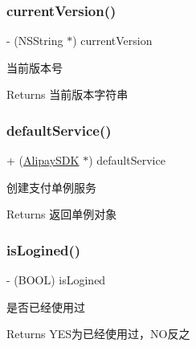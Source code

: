 \subsubsection{\texorpdfstring{current\+Version()}{currentVersion()}}
{\footnotesize\ttfamily -\/ (N\+S\+String $\ast$) current\+Version \begin{DoxyParamCaption}{ }\end{DoxyParamCaption}}

当前版本号

\begin{DoxyReturn}{Returns}
当前版本字符串 
\end{DoxyReturn}
\mbox{\label{interface_alipay_s_d_k_aee9e226315592b79d221e0cfd8959971}} 
\subsubsection{\texorpdfstring{default\+Service()}{defaultService()}}
{\footnotesize\ttfamily + (\mbox{\hyperlink{interface_alipay_s_d_k}{Alipay\+S\+DK}} $\ast$) default\+Service \begin{DoxyParamCaption}{ }\end{DoxyParamCaption}}

创建支付单例服务

\begin{DoxyReturn}{Returns}
返回单例对象 
\end{DoxyReturn}
\mbox{\label{interface_alipay_s_d_k_a23441b8570f40e561a4b21c5adad14bf}} 
\subsubsection{\texorpdfstring{is\+Logined()}{isLogined()}}
{\footnotesize\ttfamily -\/ (B\+O\+OL) is\+Logined \begin{DoxyParamCaption}{ }\end{DoxyParamCaption}}

是否已经使用过

\begin{DoxyReturn}{Returns}
Y\+E\+S为已经使用过，\+N\+O反之 
\end{DoxyReturn}
\mbox{\label{interface_alipay_s_d_k_ab454a56d82c72b10d857b44213699386}} 
